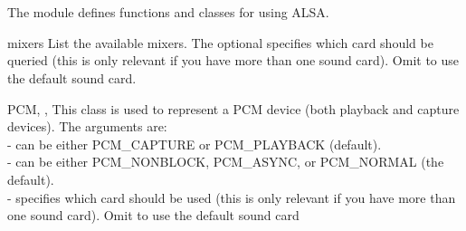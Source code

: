 \section{}







The  module defines functions and classes for using
ALSA.


\begin{funcdesc}{mixers}{}
List the available mixers. The optional  specifies which
card should be queried (this is only relevant if you have more than one
sound card). Omit to use the default sound card.
\end{funcdesc}

\begin{classdesc}{PCM}{, , }
  This class is used to represent a PCM device (both playback and
  capture devices).
  The arguments are: \\
   - can be either PCM_CAPTURE or PCM_PLAYBACK (default). \\
   - can be either PCM_NONBLOCK, PCM_ASYNC, or PCM_NORMAL (the default).\\
   - specifies which card should be used (this is only
  relevant if you have more than one sound card). Omit to use the
  default sound card
\end{classdesc}

